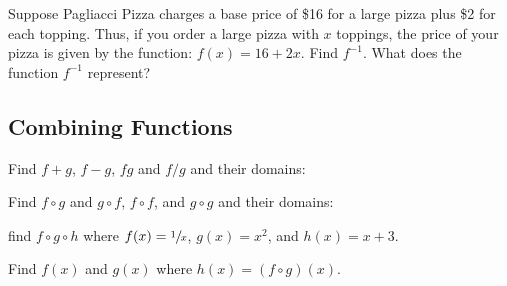 \documentclass[fleqn,addpoints]{exam}
\begin{document}
\begin{questions}

\question
Suppose Pagliacci Pizza charges a base price of \$16 for a large pizza plus \$2 for each topping.  Thus, if you order a
large pizza with $x$ toppings, the price of your pizza is given by the function: $f(x) = 16 + 2x$.  Find $f^{-1}$.  What
does the function $f^{-1}$ represent?

\subsection{Combining Functions}

\question
Find $f+g$, $f-g$, $fg$ and $f/g$ and their domains:

\question
Find $f \circ g$ and $g \circ f$, $f \circ f$, and $g \circ g$ and their domains:

\question find $f \circ g \circ h$ where $f(x) = \sfrac{1}{x}$, $g(x) = x^2$, and $h(x) = x+3$.

\question
Find $f(x)$ and $g(x)$ where $h(x) = (f \circ g)(x)$.
\begin{parts}

\end{parts}
\end{questions}
\end{document}
